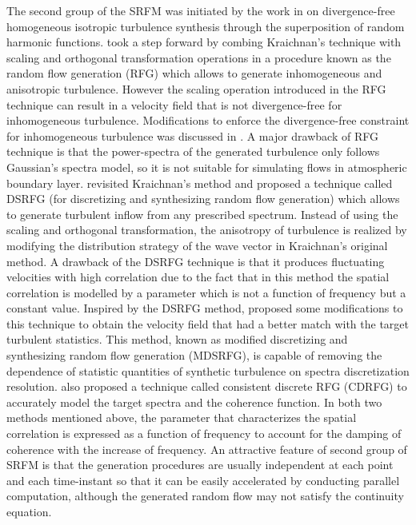 The second group of the SRFM was initiated by the work in \cite{kraichnan1970} on divergence-free homogeneous isotropic turbulence synthesis through the superposition of random harmonic functions. \cite{smirnov2001} took a step forward by combing Kraichnan's technique with scaling and orthogonal transformation operations in a procedure known as the random flow generation (RFG) which allows to generate inhomogeneous and anisotropic turbulence. However the scaling operation introduced in the RFG technique can result in a velocity field that is not divergence-free for inhomogeneous turbulence. Modifications to enforce the divergence-free constraint for inhomogeneous turbulence was discussed in \cite{yu2014}. A major drawback of RFG technique is that the power-spectra of the generated turbulence only follows Gaussian's spectra model, so it is not suitable for simulating flows in atmospheric boundary layer. \cite{huang2010} revisited Kraichnan's method and proposed a technique called DSRFG (for discretizing and synthesizing random flow generation) which allows to generate turbulent inflow from any prescribed spectrum. Instead of using the scaling and orthogonal transformation, the anisotropy of turbulence is realized by modifying the distribution strategy of the wave vector in Kraichnan's original method. A drawback of the DSRFG technique is that it produces fluctuating velocities with high correlation due to the fact that in this method the spatial correlation is modelled by a parameter which is not a function of frequency but a constant value. Inspired by the DSRFG method, \cite{castro2017} proposed some modifications to this technique to obtain the velocity field that had a better match with the target turbulent statistics. This method, known as modified discretizing and synthesizing random flow generation (MDSRFG), is capable of removing the dependence of statistic quantities of synthetic turbulence on spectra discretization resolution. \cite{aboshosha2015} also proposed a technique called consistent discrete RFG (CDRFG) to accurately model the target spectra and the coherence function. In both two methods mentioned above, the parameter that characterizes the spatial correlation is expressed as a function of frequency to account for the damping of coherence with the increase of frequency. An attractive feature of second group of SRFM is that the generation procedures are usually independent at each point and each time-instant so that it can be easily accelerated by conducting parallel computation, although the generated random flow may not satisfy the continuity equation. 


